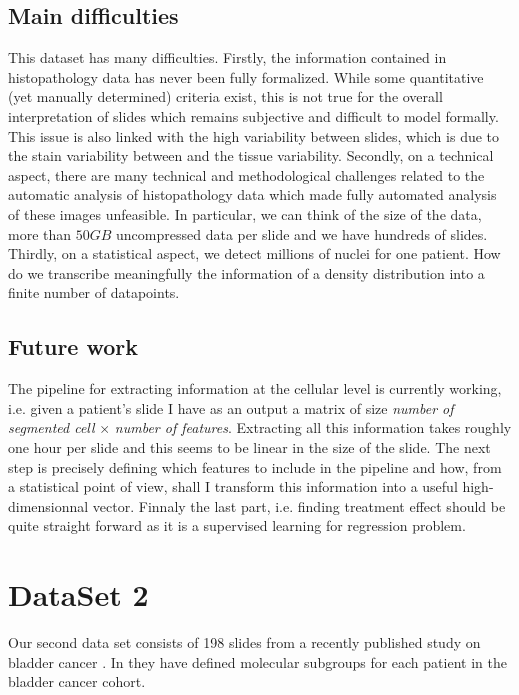 \documentclass[a4paper,10pt,twocolumn]{article}
\begin{document}
\subsection{Main difficulties}
This dataset has many difficulties. Firstly, the information
contained in histopathology data has never been fully
formalized. While some quantitative (yet manually determined) criteria
exist, this is not true for the overall interpretation of slides
which remains subjective and difficult to model formally. This issue is also linked with the high variability 
between slides, which is due to the stain variability between and the tissue variability. 
Secondly, on a technical aspect, there are many technical and methodological challenges related
  to the automatic analysis of histopathology data which made fully
  automated analysis of these images unfeasible. In particular, we can
  think of the size of the data, more than $50GB$ uncompressed data
  per slide and we have hundreds of slides. 
  Thirdly, on a statistical aspect, we detect millions of nuclei for one patient. How do we transcribe meaningfully the information of a density distribution into a finite number of datapoints.
  
\subsection{Future work}
The pipeline for extracting information at the cellular level is currently working, i.e. given a patient's slide I have as an output a matrix of size \textit{number of segmented cell} $\times$ \textit{number of features}. Extracting all this information takes roughly one hour per slide and this seems to be linear in the size of the slide. The next step is precisely defining which features to include in the pipeline and how, from a statistical point of view, shall I transform this information into a useful high-dimensionnal vector. Finnaly the last part, i.e. finding treatment effect should be quite straight forward as it is a  supervised learning for regression problem.

\section{DataSet 2}

Our second data set consists of 198 slides from a recently published study on bladder cancer
\citep{biton2014independent}. In \citep{biton2014independent} they have defined molecular subgroups for each patient in the bladder cancer cohort. 
\end{document}
